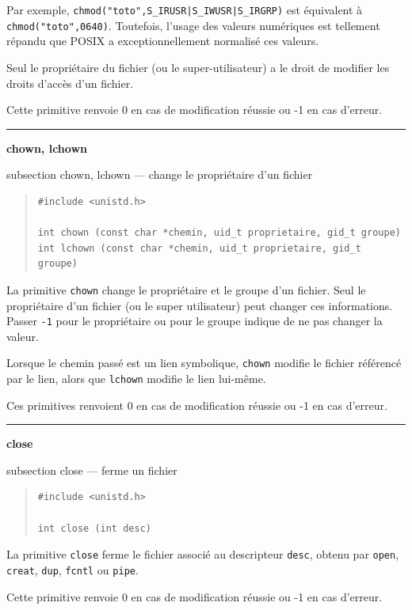 \documentclass [twoside] {report}
\newcommand {\primitive} [1]
    {
	\phantomsection
	{\large \textbf {#1}}
	\addcontentsline {toc} {subsection} {#1}
    }
\newcommand {\separation}
    {
	\vspace {5mm}
	\nopagebreak
	\hrule
    }
\begin{document}
Par exemple, \verb/chmod("toto",S_IRUSR|S_IWUSR|S_IRGRP)/ est
équivalent à \verb/chmod("toto",0640)/.
Toutefois, l'usage des valeurs numériques est tellement répandu que
POSIX a exceptionnellement normalisé ces valeurs.

Seul le propriétaire du fichier (ou le
super-utilisateur) a le droit de modifier les
droits d'accès d'un fichier.

Cette primitive renvoie 0 en cas de modification
réussie ou -1 en cas d'erreur.




\separation
\primitive {chown, lchown} --- change le propriétaire d'un fichier

\begin {quote}
\begin {verbatim}
#include <unistd.h>

int chown (const char *chemin, uid_t proprietaire, gid_t groupe)
int lchown (const char *chemin, uid_t proprietaire, gid_t groupe)
\end{verbatim}
\end {quote}

La primitive \texttt {chown} change le propriétaire et le groupe d'un
fichier.  Seul le propriétaire d'un fichier (ou le super utilisateur)
peut changer ces informations.  Passer \texttt {-1} pour le propriétaire
ou pour le groupe indique de ne pas changer la valeur.

Lorsque le chemin passé est un lien symbolique, \texttt {chown} modifie
le fichier référencé par le lien, alors que \texttt {lchown} modifie
le lien lui-même.

Ces primitives renvoient 0 en cas de modification
réussie ou -1 en cas d'erreur.




\separation
\primitive {close} --- ferme un fichier

\begin {quote}
\begin {verbatim}
#include <unistd.h>

int close (int desc)
\end{verbatim}
\end {quote}

La primitive \texttt {close} ferme le fichier associé
au descripteur \texttt {desc}, obtenu par \texttt {open},
\texttt {creat}, \texttt {dup}, \texttt {fcntl} ou \texttt {pipe}.

Cette primitive renvoie 0 en cas de modification
réussie ou -1 en cas d'erreur.
\end{document}
